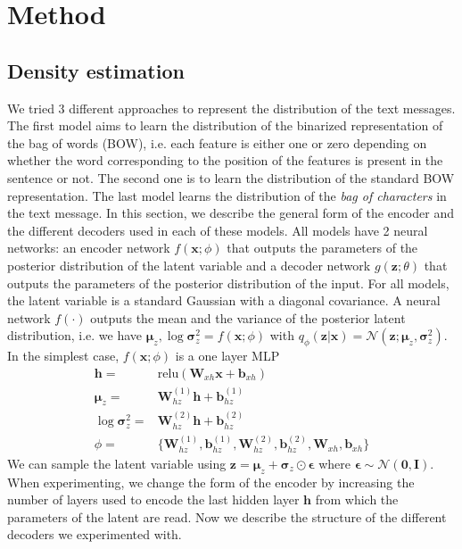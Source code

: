 \documentclass[10pt]{article}
\newcommand{\relu}{\mathrm{relu}}
\begin{document}
\section{Method}
\subsection{Density estimation}
We tried 3 different approaches to represent the distribution of the text messages. The first model aims to learn the distribution of the binarized representation of the bag of words (BOW), i.e. each feature is either one or zero depending on whether the word corresponding to the position of the features is present in the sentence or not. The second one is to learn the distribution of the standard BOW representation. The last model learns the distribution of the \emph{bag of characters} in the text message. In this section, we describe the general form of the encoder and the different decoders used in each of these models. All models have 2 neural networks: an encoder network $f(\mathbf{x};\phi)$ that outputs the parameters of the posterior distribution of the latent variable and a decoder network $g(\mathbf{z};\theta)$ that outputs the parameters of the posterior distribution of the input. For all models, the latent variable is a standard Gaussian with a diagonal covariance. A neural network $f(\cdot)$ outputs the mean and the variance of the posterior latent distribution, i.e. we have $\bm{\mu}_z,\log\bm{\sigma}_z^2 = f(\mathbf{x};\phi)$ with $q_\phi(\mathbf{z}|\mathbf{x}) = \mathcal{N}(\mathbf{z};\bm{\mu}_z, \bm{\sigma}_z^2)$. In the simplest case, $f(\mathbf{x};\phi)$ is a one layer MLP
\begin{equation}
	\begin{split}
		\mathbf{h} =& \relu\left(\mathbf{W}_{xh}\mathbf{x}+\mathbf{b}_{xh}\right)\\
		\bm{\mu}_z =& \mathbf{W}^{(1)}_{hz}\mathbf{h}+\mathbf{b}^{(1)}_{hz}\\
		\log \bm{\sigma}_z^2 =& \mathbf{W}^{(2)}_{hz}\mathbf{h}+\mathbf{b}^{(2)}_{hz}\\
		\phi =& \{\mathbf{W}^{(1)}_{hz}, \mathbf{b}^{(1)}_{hz}, \mathbf{W}^{(2)}_{hz}, \mathbf{b}^{(2)}_{hz}, \mathbf{W}_{xh}, \mathbf{b}_{xh}\}
	\end{split}
\end{equation}
We can sample the latent variable using $\mathbf{z}=\bm{\mu}_z + \bm{\sigma}_z\odot \bm{\epsilon}$ where $\bm{\epsilon}\sim \mathcal{N}(\bm{0}, \bm{I})$. When experimenting, we change the form of the encoder by increasing the number of layers used to encode the last hidden layer $\mathbf{h}$ from which the parameters of the latent are read. Now we describe the structure of the different decoders we experimented with.
\end{document}
